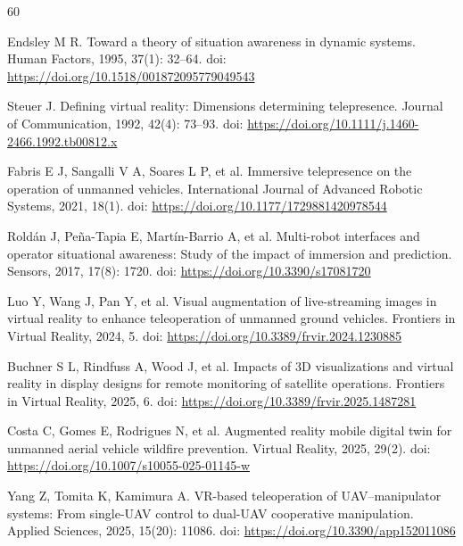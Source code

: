 \documentclass[fleqn]{VRIH2025}
\begin{document}

\begin{thebibliography}{60}

Endsley M R. Toward a theory of situation awareness in dynamic systems. Human Factors, 1995, 37(1): 32--64. doi: \url{https://doi.org/10.1518/001872095779049543}

Steuer J. Defining virtual reality: Dimensions determining telepresence. Journal of Communication, 1992, 42(4): 73--93. doi: \url{https://doi.org/10.1111/j.1460-2466.1992.tb00812.x}

Fabris E J, Sangalli V A, Soares L P, et al. Immersive telepresence on the operation of unmanned vehicles. International Journal of Advanced Robotic Systems, 2021, 18(1). doi: \url{https://doi.org/10.1177/1729881420978544}

Rold\'an J, Pe\~na-Tapia E, Mart\'in-Barrio A, et al. Multi-robot interfaces and operator situational awareness: Study of the impact of immersion and prediction. Sensors, 2017, 17(8): 1720. doi: \url{https://doi.org/10.3390/s17081720}

Luo Y, Wang J, Pan Y, et al. Visual augmentation of live-streaming images in virtual reality to enhance teleoperation of unmanned ground vehicles. Frontiers in Virtual Reality, 2024, 5. doi: \url{https://doi.org/10.3389/frvir.2024.1230885}

Buchner S L, Rindfuss A, Wood J, et al. Impacts of 3D visualizations and virtual reality in display designs for remote monitoring of satellite operations. Frontiers in Virtual Reality, 2025, 6. doi: \url{https://doi.org/10.3389/frvir.2025.1487281}

Costa C, Gomes E, Rodrigues N, et al. Augmented reality mobile digital twin for unmanned aerial vehicle wildfire prevention. Virtual Reality, 2025, 29(2). doi: \url{https://doi.org/10.1007/s10055-025-01145-w}

Yang Z, Tomita K, Kamimura A. VR-based teleoperation of UAV--manipulator systems: From single-UAV control to dual-UAV cooperative manipulation. Applied Sciences, 2025, 15(20): 11086. doi: \url{https://doi.org/10.3390/app152011086}


\end{thebibliography}
\end{document}
